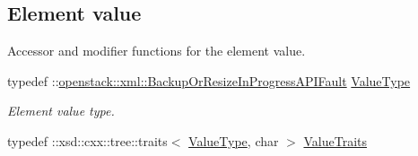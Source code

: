\subsection*{Element value}
\label{_amgrp2ee2eae1a8c390ea033f241c027da8d6}
Accessor and modifier functions for the element value. \begin{DoxyCompactItemize}
\item 
\hypertarget{classopenstack_1_1xml_1_1BackupOrResizeInProgress_a8ba8bb2533601154f28123872c992c22}{
typedef ::\hyperlink{classopenstack_1_1xml_1_1BackupOrResizeInProgressAPIFault}{openstack::xml::BackupOrResizeInProgressAPIFault} \hyperlink{classopenstack_1_1xml_1_1BackupOrResizeInProgress_a8ba8bb2533601154f28123872c992c22}{ValueType}}
\label{classopenstack_1_1xml_1_1BackupOrResizeInProgress_a8ba8bb2533601154f28123872c992c22}

\begin{DoxyCompactList}\small\item\em Element value type. \item\end{DoxyCompactList}\item 
\hypertarget{classopenstack_1_1xml_1_1BackupOrResizeInProgress_adbc096515c1d2c77b76af5bff4a96b23}{
typedef ::xsd::cxx::tree::traits$<$ \hyperlink{classopenstack_1_1xml_1_1BackupOrResizeInProgressAPIFault}{ValueType}, char $>$ \hyperlink{classopenstack_1_1xml_1_1BackupOrResizeInProgress_adbc096515c1d2c77b76af5bff4a96b23}{ValueTraits}}
\label{classopenstack_1_1xml_1_1BackupOrResizeInProgress_adbc096515c1d2c77b76af5bff4a96b23}


\end{DoxyCompactItemize}
